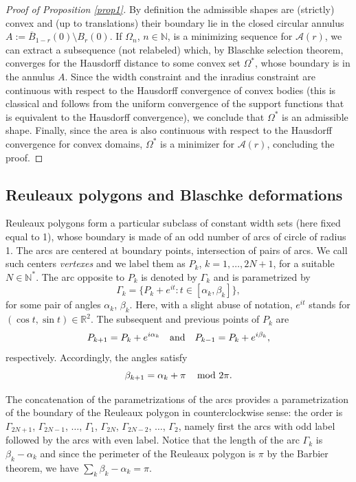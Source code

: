 \documentclass[JEP,XML,SOM,Unicode,NoFloatCountersInSection]{cedram}
\let\mathcal\mathscr
\let\sep :
\theoremstyle{plain}
\theoremstyle{definition}
\newcommand\A{\mathcal A}
\let\B\Gamma
\begin{document}
\begin{proof}[Proof of Proposition \ref{prop1}]
By definition the admissible shapes are (strictly) convex and (up to translations) their boundary lie in the closed circular annulus $A:=\overline{B}_{1-r}(0)\setminus B_r(0)$.
If $\Omega_n$, $n\in \mathbb N$, is a minimizing sequence for $\A(r)$, we can extract a subsequence (not relabeled) which, by Blaschke selection theorem, converges for the Hausdorff distance to some convex set $\Omega^*$, whose boundary is in the annulus $A$.
{Since the width constraint and the inradius constraint are continuous with respect to the Hausdorff convergence of convex bodies (this is classical and follows from the uniform convergence
of the support functions that is equivalent to the Hausdorff convergence), we conclude that $\Omega^*$ is an admissible shape.} Finally, since the area is also continuous with respect to the Hausdorff convergence for convex domains, $\Omega^*$ is a minimizer for $\A(r)$, concluding the proof.
\end{proof}

\subsection{Reuleaux polygons and Blaschke deformations}

Reuleaux polygons form a particular subclass of constant width sets (here fixed equal to 1), whose boundary is made of an odd number of arcs of circle of radius 1.
The arcs are centered at boundary points, intersection of pairs of arcs. We call such centers \emph{vertexes} and we label them as $P_k$, $k=1,\ldots, 2N+1$, for a suitable $N\in \mathbb N^*$. The arc opposite to $P_k$ is denoted by $\B_k$ and is parametrized by
\[
\B_k=\{P_k + e^{it}\sep t\in [\alpha_k, \beta_k]\},
\]
for some pair of angles $\alpha_k$, $\beta_k$. Here, with a slight abuse of notation, $e^{it}$ stands for $(\cos t, \sin t)\in \mathbb R^2$. The subsequent and previous points of $P_k$ are
\[
P_{k+1}=P_k + e^{i\alpha_k}\quad \hbox{and}\quad P_{k-1}=P_{k} + e^{i\beta_k},
\]
respectively. Accordingly, the angles satisfy
\[
\beta_{k+1}= \alpha_k +\pi \,\quad \hbox{mod }2\pi.
\]

The concatenation of the parametrizations of the arcs provides a parametrization of the boundary of the Reuleaux polygon in counterclockwise sense: the order is $\B_{2N+1}$, $\B_{2N-1}$, $\ldots$, $\B_{1}$, $\B_{2N}$, $\B_{2N-2}$, $\ldots$, $\B_2$, namely first the arcs with odd label followed by the arcs with even label.
Notice that the length of the arc $\B_k$ is $\beta_k-\alpha_k$ and since the perimeter of the Reuleaux polygon is $\pi$ by the Barbier theorem, we have $\sum_k \beta_k - \alpha_k =\pi$.
\end{document}
